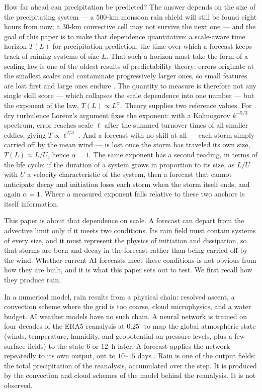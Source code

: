 \documentclass[draft]{agujournal2019}
\begin{document}
How far ahead can precipitation be predicted? The answer depends on the size
of the precipitating system --- a 500-km monsoon rain shield will still be
found eight hours from now; a 30-km convective cell may not survive the next
one --- and the goal of this paper is to make that dependence quantitative:
a scale-aware time horizon $T(L)$ for precipitation prediction, the time
over which a forecast keeps track of raining systems of size $L$. That such
a horizon must take the form of a scaling law is one of the oldest results
of predictability theory: errors originate at the smallest scales and
contaminate progressively larger ones, so small features are lost first and
large ones endure \cite{lorenz1969, hohenegger2007, zhang2003}. The quantity
to measure is therefore not any single skill score --- which collapses the
scale dependence into one number --- but the exponent of the law,
$T(L) \propto L^{\alpha}$. Theory supplies two reference values. For dry
turbulence Lorenz's argument fixes the exponent: with a Kolmogorov
$k^{-5/3}$ spectrum, error reaches scale $\ell$ after the summed turnover
times of all smaller eddies, giving $T \propto \ell^{2/3}$
\cite{lorenz1969, rotunno2008}. And a forecast with no skill at all ---
each storm simply carried off by the mean wind --- is lost once the storm
has traveled its own size, $T(L) \approx L/U$, hence $\alpha = 1$. The
same exponent has a second reading, in terms of the life cycle: if the
duration of a system grows in proportion to its size, as $L/U$ with $U$ a
velocity characteristic of the system, then a forecast that cannot
anticipate decay and initiation loses each storm when the storm itself
ends, and again $\alpha = 1$. Where a
measured exponent falls relative to these two anchors is itself
information.

This paper is about that dependence on scale. A forecast can depart from
the advective limit only if it meets two conditions. Its rain field must
contain systems of every size, and it must represent the physics of
initiation and dissipation, so that storms are born and decay in the
forecast rather than being carried off by the wind. Whether current AI
forecasts meet these conditions is not obvious from how they are built,
and it is what this paper sets out to test. We first recall how they produce rain.

In a numerical model, rain results from a physical chain: resolved ascent,
a convection scheme where the grid is too coarse, cloud microphysics, and a
water budget. AI weather models have no such chain. A neural network is
trained on four decades of the ERA5 reanalysis at $0.25^{\circ}$ to map the
global atmospheric state (winds, temperature, humidity, and geopotential on
pressure levels, plus a few surface fields) to the state $6$ or $12$~h
later. A forecast applies the network repeatedly to its own output, out to
$10$--$15$ days \cite{lam2023, chen2023, price2025}. Rain is one of the
output fields: the total precipitation of the reanalysis, accumulated over
the step. It is produced by the convection and cloud schemes of the model
behind the reanalysis. It is not observed.
\end{document}
